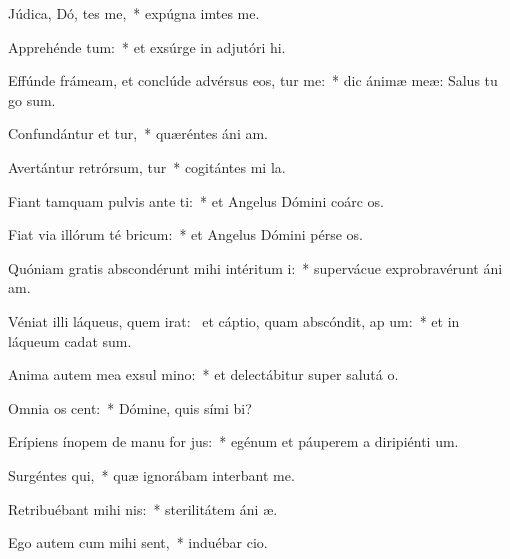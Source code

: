 \item Júdica, Dó, tes me,~* expúgna imtes me.
\item Apprehénde   tum:~* et exsúrge in adjutóri hi.
\item Effúnde frámeam, et conclúde advérsus eos,  tur me:~* dic ánimæ meæ: Salus tu go sum.
\item Confundántur et tur,~* quæréntes áni am.
\item Avertántur retrórsum,  tur~* cogitántes mi la.
\item Fiant tamquam pulvis ante  ti:~* et Angelus Dómini coárc os.
\item Fiat via illórum té  bricum:~* et Angelus Dómini pérse os.
\item Quóniam gratis abscondérunt mihi intéritum  i:~* supervácue exprobravérunt áni am.
\item Véniat illi láqueus, quem irat:~\pscross{} et cáptio, quam abscóndit, ap um:~* et in láqueum cadat  sum.
\item Anima autem mea exsul  mino:~* et delectábitur super salutá o.
\item Omnia os  cent:~* Dómine, quis sími bi?
\item Erípiens ínopem de manu for jus:~* egénum et páuperem a diripiénti um.
\item Surgéntes  qui,~* quæ ignorábam interbant me.
\item Retribuébant mihi   nis:~* sterilitátem áni æ.
\item Ego autem cum mihi  sent,~* induébar cio.
